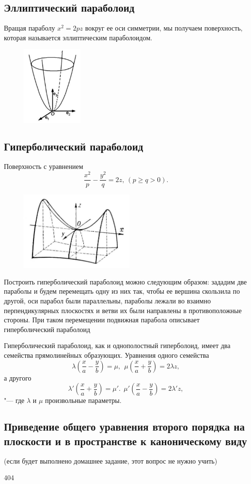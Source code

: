 \subsection*{Эллиптический параболоид}
Вращая параболу $x^2 = 2pz$ вокруг ее
оси симметрии, мы получаем поверхность, которая называется эллиптическим параболоидом.
\begin{figure}[H]
  \centering
  \includegraphics[height = 4cm]{images/second_ellipsoid_parabola.png}
\end{figure}

\subsection*{Гиперболический параболоид}
Поверхность с уравнением $$
  \frac{x^2}{p} - \frac{y^2}{q} = 2z, ~ (p \geq q > 0).
$$
\begin{figure}[H]
  \centering
  \includegraphics[height = 4cm]{images/second_hyperboloid_parabola.jpg}
\end{figure}

Построить гиперболический параболоид можно
следующим образом: зададим две параболы и будем перемещать одну из них так, чтобы ее вершина скользила по другой, оси парабол были параллельны, параболы лежали во взаимно перпендикулярных плоскостях и ветви их были направлены в противоположные стороны. При таком перемещении
подвижная парабола описывает гиперболический параболоид

Гиперболический параболоид, как и однополостный гиперболоид, имеет два семейства прямолинейных образующих. Уравнения одного семейства $$
  \lambda (\frac{x}{a} - \frac{y}{b}) = \mu, ~~ \mu (\frac{x}{a} + \frac{y}{b}) = 2\lambda z,
$$
а другого  $$
  \lambda'(\frac{x}{a} + \frac{y}{b}) = \mu'. ~~
  \mu'(\frac{x}{a} - \frac{y}{b}) = 2\lambda'z,
$$ "--- где $\lambda$ и $\mu$ произвольные параметры.

\subsection*{Приведение общего уравнения второго порядка на плоскости и в пространстве к каноническому виду}
(если будет выполнено домашнее задание, этот вопрос не нужно учить)

404